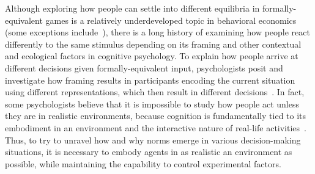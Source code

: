 
Although exploring how people can settle into different equilibria in
formally-equivalent games is a relatively underdeveloped topic in
behavioral economics (some exceptions
include~\cite{cooper03,devetag08,diguida13}), there is a long history
of examining how people react differently to the same stimulus
depending on its framing and other contextual and ecological factors
in cognitive psychology. To explain how people arrive at different
decisions given formally-equivalent input, psychologists posit and
investigate how framing results in participants encoding the current
situation using different representations, which then result in
different decisions~\cite{austerweil13,chomsky59}. In fact, some
psychologists believe that it is impossible to study how people act
unless they are in realistic environments, because cognition is
fundamentally tied to its embodiment in an environment and the
interactive nature of real-life
activities~\cite{hutchins10,wilson02}. Thus, to try to unravel how and
why norms emerge in various decision-making situations, it is
necessary to embody agents in as realistic an environment as possible,
while maintaining the capability to control experimental factors.

